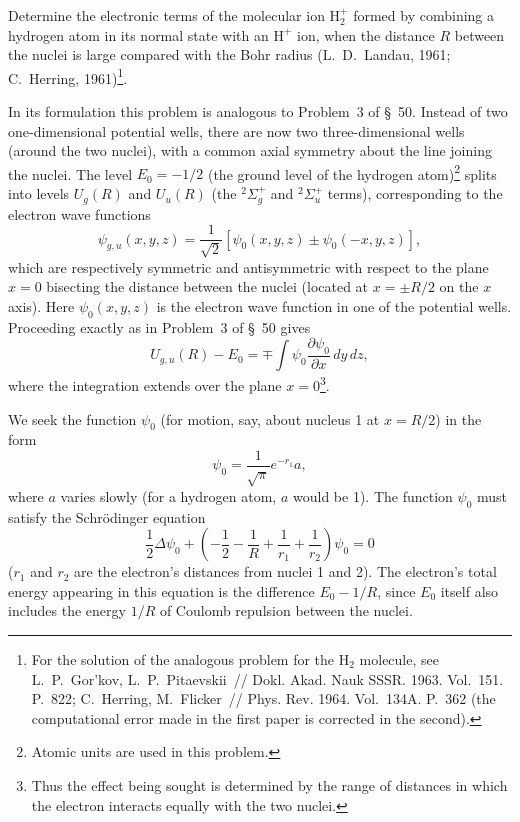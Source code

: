 \ProblemHeading Determine the electronic terms of the molecular ion $\mathrm H_2^+$ formed by combining a hydrogen atom in its normal state with an $\mathrm H^+$ ion, when the distance $R$ between the nuclei is large compared with the Bohr radius (L.~D.~Landau, 1961; C.~Herring, 1961)\footnote{For the solution of the analogous problem for the $\mathrm H_2$ molecule, see L.~P.~Gor'kov, L.~P.~Pitaevskii~// Dokl. Akad. Nauk SSSR. 1963. Vol.~151. P.~822; C.~Herring, M.~Flicker~// Phys. Rev. 1964. Vol.~134A. P.~362 (the computational error made in the first paper is corrected in the second).}.

\SolutionHeading In its formulation this problem is analogous to Problem~3 of \S~50. Instead of two one-dimensional potential wells, there are now two three-dimensional wells (around the two nuclei), with a common axial symmetry about the line joining the nuclei. The level $E_0=-1/2$ (the ground level of the hydrogen atom)\footnote{Atomic units are used in this problem.} splits into levels $U_g(R)$ and $U_u(R)$ (the ${}^2\Sigma_g^+$ and ${}^2\Sigma_u^+$ terms), corresponding to the electron wave functions
\[\psi_{g,u}(x,y,z)=\frac1{\sqrt2}[\psi_0(x,y,z)\pm\psi_0(-x,y,z)],\]
which are respectively symmetric and antisymmetric with respect to the plane $x=0$ bisecting the distance between the nuclei (located at $x=\pm R/2$ on the $x$ axis). Here $\psi_0(x,y,z)$ is the electron wave function in one of the potential wells. Proceeding exactly as in Problem~3 of \S~50 gives
\begin{equation}U_{g,u}(R)-E_0=\mp\int\psi_0\frac{\partial\psi_0}{\partial x}\,dy\,dz,\tag{1}\end{equation}
where the integration extends over the plane $x=0$\footnote{Thus the effect being sought is determined by the range of distances in which the electron interacts equally with the two nuclei.}.

We seek the function $\psi_0$ (for motion, say, about nucleus 1 at $x=R/2$) in the form
\begin{equation}\psi_0=\frac1{\sqrt\pi}e^{-r_1}a,\tag{2}\end{equation}
where $a$ varies slowly (for a hydrogen atom, $a$ would be 1). The function $\psi_0$ must satisfy the Schrödinger equation
\begin{equation}\frac12\Delta\psi_0+\left(-\frac12-\frac1R+\frac1{r_1}+\frac1{r_2}\right)\psi_0=0\tag{3}\end{equation}
($r_1$ and $r_2$ are the electron's distances from nuclei 1 and 2). The electron's total energy appearing in this equation is the difference $E_0-1/R$, since $E_0$ itself also includes the energy $1/R$ of Coulomb repulsion between the nuclei.

